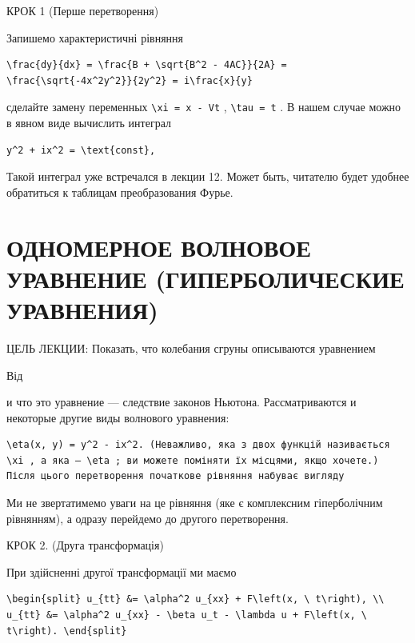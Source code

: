 \documentclass[
  ukrainian,
]{article}
\begin{document}
КРОК 1 (Перше перетворення)

Запишемо характеристичні рівняння

\begin{verbatim}
\frac{dy}{dx} = \frac{B + \sqrt{B^2 - 4AC}}{2A} = \frac{\sqrt{-4x^2y^2}}{2y^2} = i\frac{x}{y}
\end{verbatim}

сделайте замену переменных \texttt{\textbackslash{}xi\ =\ x\ -\ Vt} ,
\texttt{\textbackslash{}tau\ =\ t} . В нашем случае можно в явном виде
вычислить интеграл

\begin{verbatim}
y^2 + ix^2 = \text{const},
\end{verbatim}

Такой интеграл уже встречался в лекции 12. Может быть, читателю будет
удобнее обратиться к таблицам преобразования Фурье.

\section{ОДНОМЕРНОЕ ВОЛНОВОЕ УРАВНЕНИЕ (ГИПЕРБОЛИЧЕСКИЕ
УРАВНЕНИЯ)}\label{ux43eux434ux43dux43eux43cux435ux440ux43dux43eux435-ux432ux43eux43bux43dux43eux432ux43eux435-ux443ux440ux430ux432ux43dux435ux43dux438ux435-ux433ux438ux43fux435ux440ux431ux43eux43bux438ux447ux435ux441ux43aux438ux435-ux443ux440ux430ux432ux43dux435ux43dux438ux44f}

ЦЕЛЬ ЛЕКЦИИ: Показать, что колебания сгруны описываются уравнением

Від

и что это уравнение --- следствие законов Ньютона. Рассматриваются и
некоторые другие виды волнового уравнения:

\begin{verbatim}
\eta(x, y) = y^2 - ix^2. (Неважливо, яка з двох функцій називається \xi , а яка — \eta ; ви можете поміняти їх місцями, якщо хочете.) Після цього перетворення початкове рівняння набуває вигляду
\end{verbatim}

Ми не звертатимемо уваги на це рівняння (яке є комплексним гіперболічним
рівнянням), а одразу перейдемо до другого перетворення.

КРОК 2. (Друга трансформація)

При здійсненні другої трансформації ми маємо

\begin{verbatim}
\begin{split} u_{tt} &= \alpha^2 u_{xx} + F\left(x, \ t\right), \\ u_{tt} &= \alpha^2 u_{xx} - \beta u_t - \lambda u + F\left(x, \ t\right). \end{split}
\end{verbatim}
\end{document}
